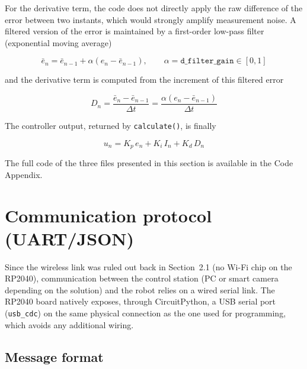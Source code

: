 \documentclass[12pt,a4paper]{report}
\begin{document}
	For the derivative term, the code does not directly apply the raw difference of the error between two instants, which would strongly amplify measurement noise. A filtered version of the error is maintained by a first-order low-pass filter (exponential moving average)
	
	\begin{equation}
		\bar{e}_n = \bar{e}_{n-1} + \alpha \left(e_n - \bar{e}_{n-1}\right), \qquad \alpha = \texttt{d\_filter\_gain} \in [0,1]
		\label{eq:pid-filter}
	\end{equation}
	
	and the derivative term is computed from the increment of this filtered error
	
	\begin{equation}
		D_n = \frac{\bar{e}_n - \bar{e}_{n-1}}{\Delta t} = \frac{\alpha \left(e_n - \bar{e}_{n-1}\right)}{\Delta t}
		\label{eq:pid-derivative}
	\end{equation}
	
	The controller output, returned by \texttt{calculate()}, is finally
	
	\begin{equation}
		u_n = K_p\,e_n + K_i\,I_n + K_d\,D_n
		\label{eq:pid-sortie}
	\end{equation}
	
	The full code of the three files presented in this section is available in the Code Appendix.
	
	\newpage
	
	
	\section{Communication protocol (UART/JSON)}
	
	Since the wireless link was ruled out back in Section~2.1 (no Wi-Fi chip on the RP2040), communication between the control station (PC or smart camera depending on the solution) and the robot relies on a wired serial link. The RP2040 board natively exposes, through CircuitPython, a USB serial port (\texttt{usb\_cdc}) on the same physical connection as the one used for programming, which avoids any additional wiring.
	
	\subsection*{Message format}
	
\end{document}
